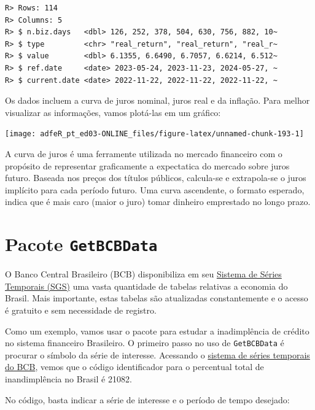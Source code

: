 \documentclass[
  11pt,
]{book}
\begin{document}
\begin{verbatim}
R> Rows: 114
R> Columns: 5
R> $ n.biz.days   <dbl> 126, 252, 378, 504, 630, 756, 882, 10~
R> $ type         <chr> "real_return", "real_return", "real_r~
R> $ value        <dbl> 6.1355, 6.6490, 6.7057, 6.6214, 6.512~
R> $ ref.date     <date> 2023-05-24, 2023-11-23, 2024-05-27, ~
R> $ current.date <date> 2022-11-22, 2022-11-22, 2022-11-22, ~
\end{verbatim}

Os dados incluem a curva de juros nominal, juros real e da inflação. Para melhor visualizar as informações, vamos plotá-las em um gráfico:

\begin{center}\texttt{[image: adfeR\_pt\_ed03-ONLINE\_files/figure-latex/unnamed-chunk-193-1]} \end{center}

A curva de juros é uma ferramente utilizada no mercado financeiro com o propósito de representar graficamente a expectatica do mercado sobre juros futuro. Baseada nos preços dos títulos públicos, calcula-se e extrapola-se o juros implícito para cada período futuro. Uma curva ascendente, o formato esperado, indica que é mais caro (maior o juro) tomar dinheiro emprestado no longo prazo.

\hypertarget{pacote-getbcbdata}{%
\section{\texorpdfstring{Pacote \texttt{GetBCBData}}{Pacote GetBCBData}}\label{pacote-getbcbdata}}

O Banco Central Brasileiro (BCB) disponibiliza em seu \href{https://www3.bcb.gov.br/sgspub/localizarseries/localizarSeries.do?method=prepararTelaLocalizarSeries}{Sistema de Séries Temporais (SGS)} uma vasta quantidade de tabelas relativas a economia do Brasil. Mais importante, estas tabelas são atualizadas constantemente e o acesso é gratuito e sem necessidade de registro.

Como um exemplo, vamos usar o pacote para estudar a inadimplência de crédito no sistema financeiro Brasileiro. O primeiro passo no uso de \texttt{GetBCBData} é procurar o símbolo da série de interesse. Acessando o \href{https://www3.bcb.gov.br/sgspub/localizarseries/localizarSeries.do?method=prepararTelaLocalizarSeries}{sistema de séries temporais do BCB}, vemos que o código identificador para o percentual total de inandimplência no Brasil é 21082.

No código, basta indicar a série de interesse e o período de tempo desejado:
\end{document}
